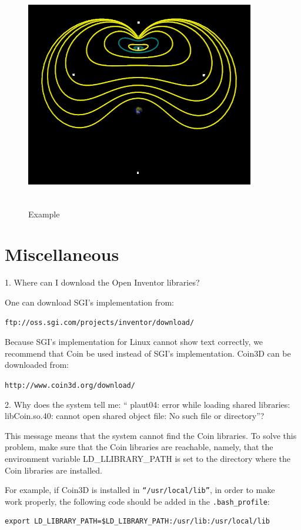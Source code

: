 \begin{figure}[!htmb]
        \centering
		\includegraphics[width=10cm, height=10cm] {./include/emL1Sol}
        \caption{Example} \label{fig:AppEx1}
\end{figure}


\section{ Miscellaneous}
{1. Where can I download the Open Inventor libraries?}

One can download SGI's implementation from:

\texttt{ftp://oss.sgi.com/projects/inventor/download/}

Because SGI's implementation for Linux cannot show text correctly, 
we recommend that Coin be used instead of SGI's implementation. 
Coin3D can be downloaded from:

\texttt{http://www.coin3d.org/download/}

{2. Why does the system tell me: `` plaut04: error while loading shared libraries: libCoin.so.40: 
cannot open shared object file: No such file or directory''?}

This message means that the system cannot find 
the Coin libraries. To solve this problem, make sure that the Coin libraries are 
reachable, namely, that the environment variable 
LD\_LLIBRARY\_PATH is set to the directory where the Coin libraries are installed.

For example, if Coin3D is installed in \texttt{``/usr/local/lib''}, 
 in order to make \PLAUT~ work properly, the following code should be added in the \texttt{.bash\_profile}:
\begin{verbatim}
export LD_LIBRARY_PATH=$LD_LIBRARY_PATH:/usr/lib:/usr/local/lib
\end{verbatim}

